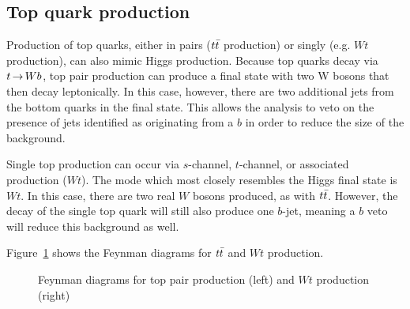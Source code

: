 \subsection{Top quark production}

Production of top quarks, either in pairs ($t\bar{t}$ production) or singly (e.g. $Wt$ production), can also mimic Higgs production. Because top quarks decay via $t\,{\rightarrow}\, Wb$, top pair production can produce a final state with two W bosons that then decay leptonically. In this case, however, there are two additional jets from the bottom quarks in the final state. This allows the analysis to veto on the presence of jets identified as originating from a $b$ in order to reduce the size of the background. 

Single top production can occur via $s$-channel, $t$-channel, or associated production ($Wt$). The mode which most closely resembles the Higgs final state is $Wt$. In this case, there are two real $W$ bosons produced, as with $t\bar{t}$. However, the decay of the single top quark will still also produce one $b$-jet, meaning a $b$ veto will reduce this background as well. 

Figure~\ref{fig:Topdiagram} shows the Feynman diagrams for $t\bar{t}$ and $Wt$ production.  

\begin{figure}[h!]
  \centering
  \captionsetup{justification=centering}

  \hspace{20pt}
  \caption{Feynman diagrams for top pair production (left) and $Wt$ production (right)}
  \label{fig:Topdiagram}
\end{figure}

